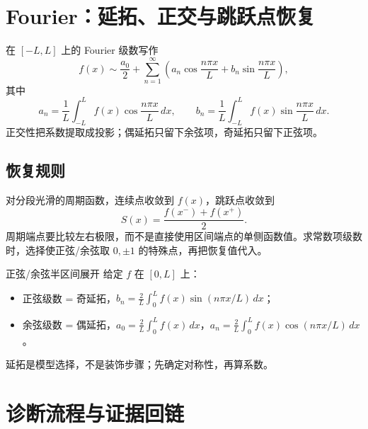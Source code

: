 \documentclass[11pt,a4paper,fontset=fandol]{ctexart}
\begin{document}
\section{Fourier：延拓、正交与跳跃点恢复}
在 $[-L,L]$ 上的 Fourier 级数写作
\[
f(x)\sim \frac{a_0}{2}+\sum_{n=1}^{\infty}\left(a_n\cos\frac{n\pi x}{L}+b_n\sin\frac{n\pi x}{L}\right),
\]
其中
\[
a_n=\frac1L\int_{-L}^{L}f(x)\cos\frac{n\pi x}{L}\,dx,\qquad
b_n=\frac1L\int_{-L}^{L}f(x)\sin\frac{n\pi x}{L}\,dx.
\]
正交性把系数提取成投影；偶延拓只留下余弦项，奇延拓只留下正弦项。

\subsection{恢复规则}
对分段光滑的周期函数，连续点收敛到 $f(x)$，跳跃点收敛到
\[
S(x)=\frac{f(x^-)+f(x^+)}2.
\]
周期端点要比较左右极限，而不是直接使用区间端点的单侧函数值。求常数项级数时，选择使正弦/余弦取 $0,\pm1$ 的特殊点，再把恢复值代入。

\begin{methodbox}{正弦/余弦半区间展开}
给定 $f$ 在 $[0,L]$ 上：
\begin{itemize}
  \item 正弦级数 = 奇延拓，$b_n=\frac2L\int_0^L f(x)\sin(n\pi x/L)\,dx$；
  \item 余弦级数 = 偶延拓，$a_0=\frac2L\int_0^L f(x)\,dx$，$a_n=\frac2L\int_0^L f(x)\cos(n\pi x/L)\,dx$。
\end{itemize}
延拓是模型选择，不是装饰步骤；先确定对称性，再算系数。
\end{methodbox}

\section{诊断流程与证据回链}
\begin{center}
\end{center}
\end{document}
